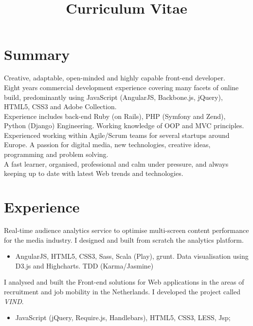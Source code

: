 \documentclass[11pt,a4paper]{moderncv-mod}
\title{Curriculum Vitae}               %
\begin{document}
\maketitle

\section{Summary}
Creative, adaptable, open-minded and highly capable front-end developer. \\Eight years commercial development experience covering many facets of online build, predominantly using JavaScript (AngularJS, Backbone.js, jQuery), HTML5, CSS3 and Adobe Collection. \\Experience includes back-end Ruby (on Rails), PHP (Symfony and Zend), Python (Django) Engineering.
Working knowledge of OOP and MVC principles. \\ Experienced working within Agile/Scrum teams for several startups around Europe. A passion for digital media, new technologies, creative ideas, programming and problem solving. \\A fast learner, organised, professional and calm under pressure, and always keeping up to date with latest Web trends and technologies.

\section{Experience}

{Real-time audience analytics service to optimise multi-screen content performance for the media industry. I designed and built from scratch the analytics platform.
\begin{itemize}%
\item AngularJS, HTML5, CSS3, Sass, Scala (Play), grunt. Data visualisation using D3.js and Highcharts. TDD (Karma/Jasmine)
\end{itemize}%
}

{I analysed and built the Front-end solutions for Web applications in the areas of recruitment and job mobility in the Netherlands. I developed the project called \emph{VIND}.
\begin{itemize}%
\item JavaScript (jQuery, Require.js, Handlebars), HTML5, CSS3, LESS, Jsp;
\end{itemize}%
}
\end{document}
